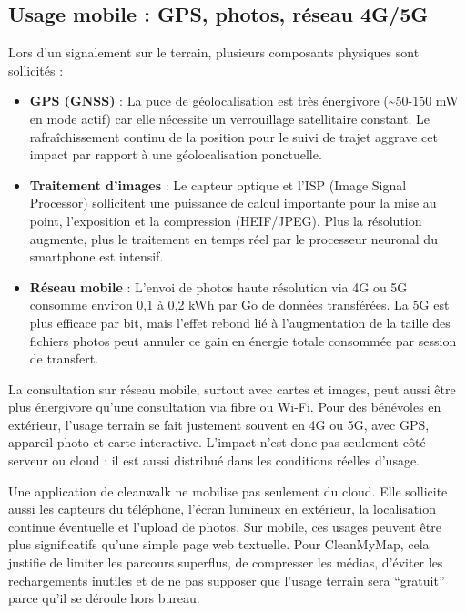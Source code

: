 \documentclass[
  10pt,
  a4paper,
  DIV=11,
  numbers=noendperiod,
  oneside]{scrreprt}
\providecommand{\tightlist}{%
  \setlength{\itemsep}{0pt}\setlength{\parskip}{0pt}}
\let\oldtextbf\textbf
\renewcommand{\textbf}[1]{\oldtextbf{\textcolor{cmmnavy}{#1}}}
\begin{document}
\subsection{Usage mobile : GPS, photos, réseau
4G/5G}\label{usage-mobile-gps-photos-ruxe9seau-4g5g}

Lors d'un signalement sur le terrain, plusieurs composants physiques
sont sollicités :

\begin{itemize}
\tightlist
\item
  \textbf{GPS (GNSS)} : La puce de géolocalisation est très énergivore
  (\textasciitilde50-150 mW en mode actif) car elle nécessite un
  verrouillage satellitaire constant. Le rafraîchissement continu de la
  position pour le suivi de trajet aggrave cet impact par rapport à une
  géolocalisation ponctuelle.
\item
  \textbf{Traitement d'images} : Le capteur optique et l'ISP (Image
  Signal Processor) sollicitent une puissance de calcul importante pour
  la mise au point, l'exposition et la compression (HEIF/JPEG). Plus la
  résolution augmente, plus le traitement en temps réel par le
  processeur neuronal du smartphone est intensif.
\item
  \textbf{Réseau mobile} : L'envoi de photos haute résolution via 4G ou
  5G consomme environ 0,1 à 0,2 kWh par Go de données transférées. La 5G
  est plus efficace par bit, mais l'effet rebond lié à l'augmentation de
  la taille des fichiers photos peut annuler ce gain en énergie totale
  consommée par session de transfert.
\end{itemize}

La consultation sur réseau mobile, surtout avec cartes et images, peut
aussi être plus énergivore qu'une consultation via fibre ou Wi-Fi. Pour
des bénévoles en extérieur, l'usage terrain se fait justement souvent en
4G ou 5G, avec GPS, appareil photo et carte interactive. L'impact n'est
donc pas seulement côté serveur ou cloud : il est aussi distribué dans
les conditions réelles d'usage.

Une application de cleanwalk ne mobilise pas seulement du cloud. Elle
sollicite aussi les capteurs du téléphone, l'écran lumineux en
extérieur, la localisation continue éventuelle et l'upload de photos.
Sur mobile, ces usages peuvent être plus significatifs qu'une simple
page web textuelle. Pour CleanMyMap, cela justifie de limiter les
parcours superflus, de compresser les médias, d'éviter les rechargements
inutiles et de ne pas supposer que l'usage terrain sera ``gratuit''
parce qu'il se déroule hors bureau.
\end{document}

